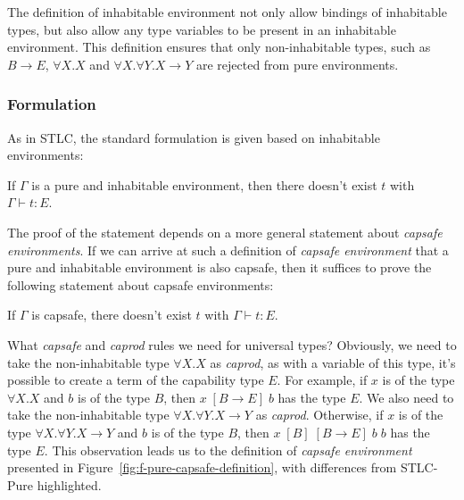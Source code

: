 The definition of inhabitable environment not only allow bindings of
inhabitable types, but also allow any type variables to be present in
an inhabitable environment. This definition ensures that only
non-inhabitable types, such as $B \to E$, $\forall X.X$ and
$\forall X.\forall Y.X \to Y$ are rejected from pure environments.

\subsubsection{Formulation}

As in STLC, the standard formulation is given based on inhabitable
environments:

\begin{definition}
  If $\Gamma$ is a pure and inhabitable environment, then there
  doesn't exist $t$ with $\Gamma \vdash t : E$.
\end{definition}

The proof of the statement depends on a more general statement about
\emph{capsafe environments}. If we can arrive at such a definition of
\emph{capsafe environment} that a pure and inhabitable environment is
also capsafe, then it suffices to prove the following statement about
capsafe environments:

\begin{definition}
  If $\Gamma$ is capsafe, there doesn't exist $t$ with
  $\Gamma \vdash t : E$.
\end{definition}

What \emph{capsafe} and \emph{caprod} rules we need for universal
types? Obviously, we need to take the non-inhabitable type
$\forall X.X$ as \emph{caprod}, as with a variable of this type, it's
possible to create a term of the capability type $E$. For example, if
$x$ is of the type $\forall X.X$ and $b$ is of the type $B$, then
$x \; [B \to E] \; b$ has the type $E$.  We also need to take the
non-inhabitable type $\forall X. \forall Y. X \to Y$ as
\emph{caprod}. Otherwise, if $x$ is of the type
$\forall X. \forall Y. X \to Y$ and $b$ is of the type $B$, then
$x \; [B] \; [B \to E] \; b \; b$ has the type $E$. This observation
leads us to the definition of \emph{capsafe environment} presented in
Figure~\ref{fig:f-pure-capsafe-definition}, with differences from
STLC-Pure highlighted.

